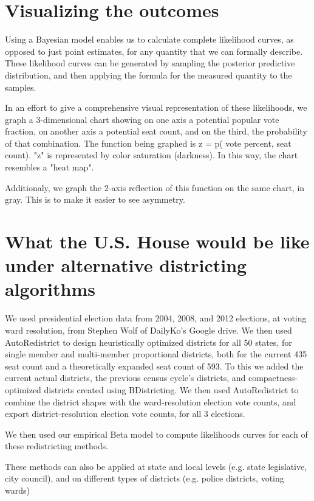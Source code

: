 \documentclass[preprint,12pt]{article}
\begin{document}
\clearpage

\section{Visualizing the outcomes}

Using a Bayesian model enables us to calculate complete likelihood curves, as opposed to just point estimates, for any quantity that we can formally describe.  These likelihood curves can be generated by sampling the posterior predictive distribution, and then applying the formula for the measured quantity to the samples.

In an effort to give a comprehensive visual representation of these likelihoods, we graph a 3-dimensional chart showing on one axis a potential popular vote fraction, on another axis a potential seat count, and on the third, the probability of that combination.  The function being graphed is z = p( vote percent, seat count). "z" is represented by color saturation (darkness).  In this way, the chart resembles a "heat map".

Additionaly, we graph the 2-axis reflection of this function on the same chart, in gray. This is to make it easier to see asymmetry.

\section{What the U.S. House would be like under alternative districting algorithms}

We used presidential election data from 2004, 2008, and 2012 elections, at voting ward resolution, from Stephen Wolf of DailyKo's Google drive.  We then used AutoRedistrict to design heuristically optimized districts for all 50 states, for single member and multi-member proportional districts, both for the current 435 seat count and a theoretically expanded seat count of 593.  To this we added the current actual districts, the previous census cycle's districts, and compactness-optimized districts created using BDistricting.   We then used AutoRedistrict to combine the district shapes with the ward-resolution election vote counts, and export district-resolution election vote counts, for all 3 elections.

We then used our empirical Beta model to compute likelihoods curves for each of these redistricting methods. 

These methods can also be applied at state and local levels (e.g. state legislative, city council), and on different types of districts (e.g. police districts, voting wards)
\end{document}

